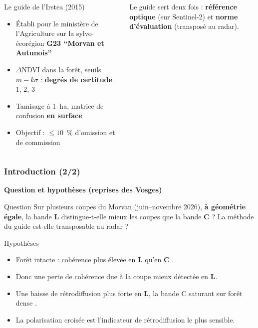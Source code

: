 \documentclass[aspectratio=169]{beamer}
\newcommand{\Lb}[1]{\textcolor{Lband}{\textbf{#1}}}
\newcommand{\Cb}[1]{\textcolor{Cband}{\textbf{#1}}}
\newcommand{\slidesubtitle}[1]{%
	\textcolor{myblue}{\small\textbf{#1}}%
	\par\vspace{3pt}%
}
\begin{document}
\begin{frame}{\phantom{x}}
\begin{columns}[T]
		\begin{block}{Le guide de l'Irstea (2015)}
			\scriptsize
			\begin{itemize}
				\setlength{\itemsep}{0pt}
				\item Établi pour le ministère de l'Agriculture sur la sylvo-écorégion \textbf{G23
				\enquote{Morvan et Autunois}}
				\item $\Delta$NDVI dans la forêt, seuils $m-k\sigma$ : \textbf{degrés de certitude} 1, 2, 3
				\item Tamisage à 1~ha, matrice de confusion \textbf{en surface}
				\item Objectif : $\leq 10$~\% d'omission et de commission
			\end{itemize}
		\end{block}
		\vspace{2pt}
		\scriptsize Le guide sert deux fois : \textbf{référence optique} (sur Sentinel-2) et \textbf{norme
		d'évaluation} (transposé au radar).
	\end{columns}
\end{frame}

\begin{frame}{\phantom{x}}
	\frametitle{Introduction (2/2)}
	\slidesubtitle{Question et hypothèses (reprises des Vosges)}
	\begin{alertblock}{Question}
		\small Sur plusieurs coupes du Morvan (juin--novembre 2026), \textbf{à géométrie égale}, la bande \Lb{L}
		distingue-t-elle mieux les coupes que la bande \Cb{C} ? La méthode du guide est-elle transposable au radar ?
	\end{alertblock}
	\vspace{0.5em}
	\begin{block}{Hypothèses}
		\footnotesize
		\begin{itemize}
			\setlength{\itemsep}{3pt}
			\item[\textbf{H1}] Forêt intacte : cohérence plus élevée en \Lb{L} qu'en \Cb{C}
			\parencite{zebker1992decorrelation}.
			\item[\textbf{H2}] Donc une perte de cohérence due à la coupe mieux détectée en \Lb{L}.
			\item[\textbf{H3}] Une baisse de rétrodiffusion plus forte en \Lb{L}, la bande C saturant sur forêt dense
			\parencite{imhoff1995saturation,joshi2015mapping}.
			\item[\textbf{H4}] La polarisation croisée est l'indicateur de rétrodiffusion le plus sensible.
		\end{itemize}
	\end{block}
\end{frame}
\end{document}

